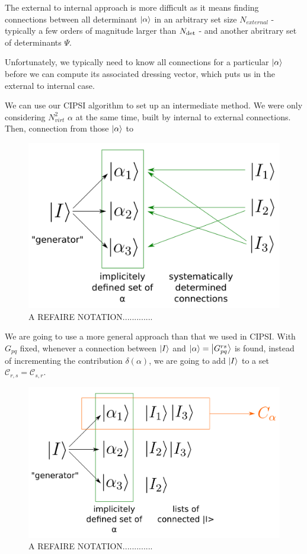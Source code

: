 \documentclass[./thesis.tex]{subfiles}
\begin{document}
The external to internal approach is more difficult as it means finding connections between all determinant ${\ket{\alpha}}$ in an arbitrary set size $N_{external}$ - typically a few orders of magnitude larger than ${N_\text{det}}$ - and another abritrary set of determinants $\Psi$. 

Unfortunately, we typically need to know all connections for a particular ${\ket{\alpha}}$ before we can compute its associated dressing vector, which puts us in the external to internal case.

We can use our CIPSI algorithm to set up an intermediate method. We were only considering $N_{virt}^2$ $\alpha$ at the same time, built by internal to external connections. Then, connection from those ${\ket{\alpha}}$ to 


\begin{figure}[h!]
	\begin{center}
		\includegraphics[width=0.7\columnwidth]{figures/matrix_dressing/findconnections}
		\caption{A REFAIRE NOTATION.............}
		\label{fig:findconnections}
	\end{center}
\end{figure}



We are going to use a more general approach than that we used in CIPSI. With $G_{pq}$ fixed, whenever a connection between $\ket I$ and ${\ket{\alpha}} = \ket {G_{pq}^{rs}}$ is found, instead of incrementing the contribution $\delta(\alpha)$, we are going to add ${\ket{I}}$ to a set $\mathcal{C}_{r,s} = \mathcal{C}_{s,r}$.

\begin{figure}[h!]
	\begin{center}
		\includegraphics[width=0.7\columnwidth]{figures/matrix_dressing/buildlists}
		\caption{A REFAIRE NOTATION.............}
		\label{fig:buildlists}
	\end{center}
\end{figure}
\end{document}
